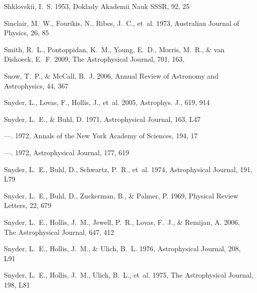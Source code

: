 \documentclass[twocolumn]{aastex631}
\begin{document}
\begin{thebibliography}{}
Shklovskii, I.~S. 1953, Doklady Akademii Nauk SSSR, 92, 25

Sinclair, M.~W., Fourikis, N., Ribes, J.~C., {et~al.} 1973, Australian Journal
  of Physics, 26, 85

{Smith}, R.~L., {Pontoppidan}, K.~M., {Young}, E.~D., {Morris}, M.~R., \& {van
  Dishoeck}, E.~F. 2009, The Astrophysical Journal, 701, 163,

Snow, T.~P., \& McCall, B.~J. 2006, Annual Review of Astronomy and
  Astrophysics, 44, 367

Snyder, L., Lovas, F., Hollis, J., {et~al.} 2005, Astrophys. J., 619, 914

Snyder, L.~E., \& Buhl, D. 1971, Astrophysical Journal, 163, L47

---. 1972{}, Annals of the New York Academy of Sciences, 194, 17

---. 1972{}, Astrophysical Journal, 177, 619

Snyder, L.~E., Buhl, D., Schwartz, P.~R., {et~al.} 1974, Astrophysical Journal,
  191, L79

Snyder, L.~E., Buhl, D., Zuckerman, B., \& Palmer, P. 1969, Physical Review
  Letters, 22, 679

Snyder, L.~E., Hollis, J.~M., Jewell, P.~R., Lovas, F.~J., \& Remijan, A. 2006,
  The Astrophysical Journal, 647, 412

Snyder, L.~E., Hollis, J.~M., \& Ulich, B.~L. 1976, Astrophysical Journal, 208,
  L91

Snyder, L.~E., Hollis, J.~M., Ulich, B.~L., {et~al.} 1975, The Astrophysical
  Journal, 198, L81


\end{thebibliography}
\end{document}
